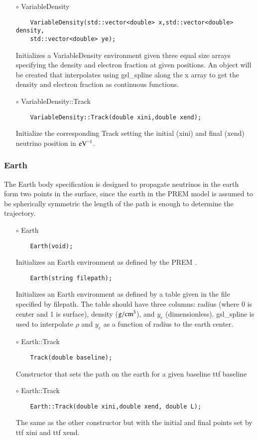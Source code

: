 \begin{itemize}
\item[$\circ$] {\ttf VariableDensity}
  \begin{lstlisting}
    VariableDensity(std::vector<double> x,std::vector<double> density,
    std::vector<double> ye);
  \end{lstlisting}
  Initializes a {\ttf VariableDensity} environment given three equal size arrays specifying the density and electron fraction at given positions. An object will be created that interpolates using {\ttfamily gsl\_spline} \citep{gough2009gnu} along the {\ttf x} array to get the density and electron fraction as continuous functions.
  \item[$\circ$] {\ttf VariableDensity::Track}
  \begin{lstlisting}
    VariableDensity::Track(double xini,double xend);
  \end{lstlisting}
  Initialize the corresponding {\ttf Track} setting the initial ({\ttf xini}) and final ({\ttf xend}) neutrino position in ${\rm eV}^{-1}$.
\end{itemize}

\subsubsection{Earth}
The {\ttf Earth} body specification is designed to propagate neutrinos
in the earth form two points in the surface, since the earth in the
PREM model is assumed to be spherically symmetric the length of the
path is enough to determine the trajectory. 
\begin{itemize}
\item[$\circ$] {\ttf Earth}
  \begin{lstlisting}
    Earth(void);
  \end{lstlisting}
  Initializes an {\ttf Earth} environment as defined by the PREM \citep{dziewonski1981preliminary}.
  \begin{lstlisting}
    Earth(string filepath);
  \end{lstlisting}
  Initializes an {\ttf Earth} environment as defined by a table given in the file specified by {\ttf filepath}. The table should have three columns: radius (where 0 is center and 1 is surface), density (${\rm g}/{\rm cm}^3$), and $y_e$ (dimensionless). {\ttfamily gsl\_spline} \citep{gough2009gnu} is used to interpolate $\rho$ and $y_e$ as a function of radius to the earth center.
\item[$\circ$] {\ttf Earth::Track}
  \begin{lstlisting}
    Track(double baseline);
  \end{lstlisting}
  Constructor that sets the path on the earth for a given baseline
  {ttf baseline}
\item[$\circ$] {\ttf Earth::Track}
  \begin{lstlisting}
    Earth::Track(double xini,double xend, double L);
  \end{lstlisting}
  The same as the other constructor but with the initial and final points set by
  {ttf xini} and {ttf xend}.
\end{itemize}

